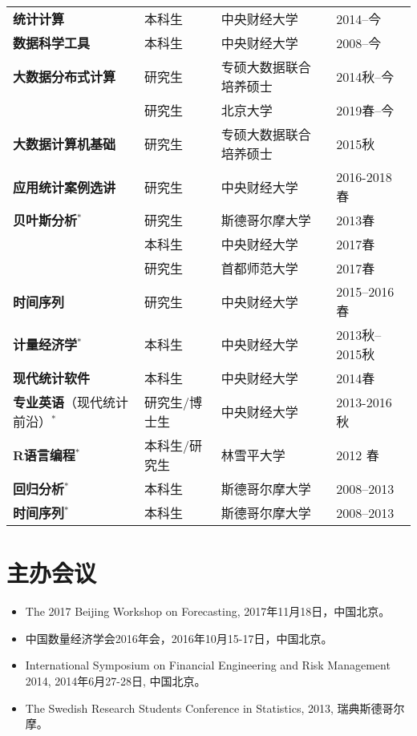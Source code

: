 \documentclass[twoside,a4paper,10pt]{amsart}
\begin{document}
\begin{tabular}{l l ll}
  \textbf{统计计算}                     & 本科生        & 中央财经大学           & 2014--今       \\
  \textbf{数据科学工具}                 & 本科生        & 中央财经大学           & 2008--今       \\
  \textbf{大数据分布式计算}             & 研究生        & 专硕大数据联合培养硕士 & 2014秋--今     \\
                                        & 研究生        & 北京大学               & 2019春--今     \\
  \textbf{大数据计算机基础}             & 研究生        & 专硕大数据联合培养硕士 & 2015秋         \\
  \textbf{应用统计案例选讲}             & 研究生        & 中央财经大学           & 2016-2018春    \\
  \textbf{贝叶斯分析}$^*$               & 研究生        & 斯德哥尔摩大学         & 2013春         \\
                                        & 本科生        & 中央财经大学           & 2017春         \\
                                        & 研究生        & 首都师范大学           & 2017春         \\
  \textbf{时间序列}                     & 研究生        & 中央财经大学           & 2015--2016春   \\
  \textbf{计量经济学}$^*$               & 本科生        & 中央财经大学           & 2013秋--2015秋 \\
  \textbf{现代统计软件}                 & 本科生        & 中央财经大学           & 2014春         \\
  \textbf{专业英语}（现代统计前沿）$^*$ & 研究生/博士生 & 中央财经大学           & 2013-2016秋    \\

  \textbf{R语言编程}$^*$&本科生/研究生&林雪平大学&  2012 春\\
  \textbf{回归分析}$^*$&本科生&斯德哥尔摩大学&2008--2013\\
  \textbf{时间序列}$^*$&本科生&斯德哥尔摩大学&2008--2013\\


\end{tabular}

\section*{主办会议}

\begin{itemize}
\item  The 2017 Beijing Workshop on Forecasting, 2017年11月18日，中国北京。
\item 中国数量经济学会2016年会，2016年10月15-17日，中国北京。

\item International Symposium on Financial Engineering and Risk Management 2014,
  2014年6月27-28日, 中国北京。

\item The Swedish Research Students Conference in Statistics, 2013, 瑞典斯德哥尔摩。

\end{itemize}
\end{document}
